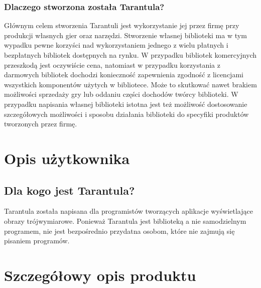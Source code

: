 \documentclass[11pt,leqno]{article}
\begin{document}
\subsubsection{Dlaczego stworzona została Tarantula?}
\noindent
Głównym celem stworzenia Tarantuli jest wykorzystanie jej przez firmę przy produkcji własnych gier oraz narzędzi. 
Stworzenie własnej biblioteki ma w tym wypadku pewne korzyści nad wykorzystaniem jednego z wielu płatnych i bezpłatnych bibliotek 
dostępnych na rynku. W przypadku bibliotek komercyjnych przeszkodą jest oczywiście cena, natomiast w przypadku korzystania z darmowych 
bibliotek dochodzi konieczność zapewnienia zgodność z licencjami wszystkich komponentów użytych w bibliotece. Może to skutkować nawet 
brakiem możliwości sprzedaży gry lub oddaniu części dochodów twórcy biblioteki. W przypadku napisania własnej biblioteki istotna jest też możliwość dostosowanie szczegółowych 
możliwości i sposobu działania biblioteki do specyfiki produktów tworzonych przez firmę.

\section{Opis użytkownika}
\subsection{Dla kogo jest Tarantula?}
\noindent
Tarantula została napisana dla programistów tworzących aplikacje wyświetlające obrazy trójwymiarowe. Ponieważ Tarantula jest biblioteką a nie samodzielnym programem, 
nie jest bezpośrednio przydatna osobom, które nie zajmują się pisaniem programów.

\section{Szczegółowy opis produktu}
\end{document}
